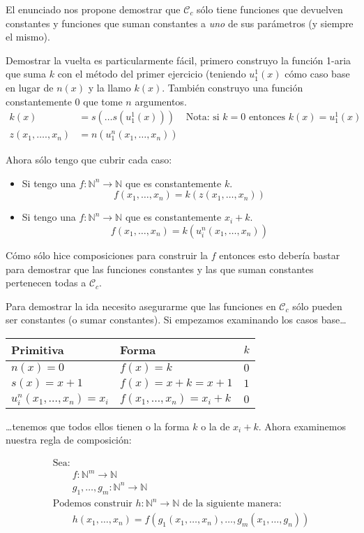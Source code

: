 \documentclass[fleqn, 11pt]{article}
\newcommand{\nat}{\mathbb{N}}
\newcommand{\Ccur}{\mathcal{C}}
\begin{document}
El enunciado nos propone demostrar que $\Ccur_c$ sólo tiene funciones que
devuelven constantes y funciones que suman constantes a \emph{uno} de sus
parámetros (y siempre el mismo).

Demostrar la vuelta es particularmente fácil, primero construyo la función
1-aria que suma $k$ con el método del primer ejercicio (teniendo $u^1_1(x)$
cómo caso base en lugar de $n(x)$ y la llamo $k(x)$. También construyo una
función constantemente 0 que tome $n$ argumentos.
\begin{align*}
	k(x)                &= s(\dots s(u^1_1(x)))
	&\text{Nota: si }k = 0 \text{\ entonces } k(x) = u^1_1(x) \\
	z(x_1, \dots., x_n) &= n(u^n_1(x_1, \dots, x_n))
\end{align*}

Ahora sólo tengo que cubrir cada caso:
\begin{itemize}
	\item Si tengo una $f: \nat^n \to \nat$ que es constantemente $k$.
		\[f(x_1, \dots, x_n) = k(z(x_1, \dots, x_n))\]
	\item Si tengo una $f: \nat^n \to \nat$ que es constantemente
		$x_i + k$.
		\[f(x_1, \dots, x_n) = k(u^n_i(x_1, \dots, x_n))\]
\end{itemize}

Cómo sólo hice composiciones para construir la $f$ entonces esto debería bastar
para demostrar que las funciones constantes y las que suman constantes
pertenecen todas a $\Ccur_c$.

Para demostrar la ida necesito asegurarme que las funciones en $\Ccur_c$ sólo
pueden ser constantes (o sumar constantes). Si empezamos examinando los casos
base\dots

\begin{center}
	\begin{tabular}{lll}
		Primitiva  & Forma                  & $k$ \\ \toprule
		$n(x)=0$   & $f(x) = k$             & $0$ \\
		$s(x)=x+1$ & $f(x) = x + k = x + 1$ & $1$ \\
		$u^n_i(x_1, \dots, x_n)=x_i$ & $f(x_1, \dots, x_n) = x_i + k$
		& $0$
	\end{tabular}
\end{center}

\dots tenemos que todos ellos tienen o la forma $k$ o la de $x_i + k$. Ahora
examinemos nuestra regla de composición:

\begin{gather*}
	\text{Sea:} \\
	\hspace{2em} f: \nat^m \to \nat \\
	\hspace{2em} g_1, \dots, g_m: \nat^n \to \nat \\
	\text{Podemos construir $h: \nat^n \to \nat$ de la siguiente manera:} \\
	\hspace{2em} h(x_1, \dots, x_n) =
	f(g_1(x_1, \dots, x_n), \dots, g_m(x_1, \dots, g_n)) \\
\end{gather*}
\end{document}
